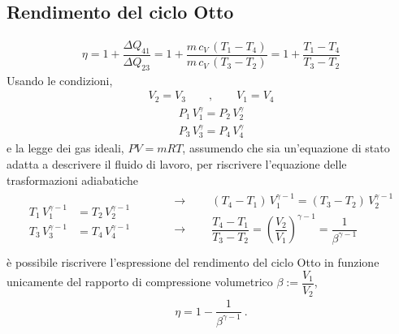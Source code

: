 \documentclass[letterpaper,10pt,italian]{jupyterBook}
\begin{document}
\subsection{Rendimento del ciclo Otto}
\label{\detokenize{ch/thermodynamics/heat-engine-otto:rendimento-del-ciclo-otto}}\begin{equation*}
\begin{split}\eta = 1 + \dfrac{\Delta Q_{41}}{\Delta Q_{23}}
       = 1 + \dfrac{m \, c_V \, (T_1 - T_4)}{m \, c_V \, (T_3 - T_2)}
       = 1 + \dfrac{T_1 - T_4}{T_3 - T_2}
\end{split}
\end{equation*}
\sphinxAtStartPar
Usando le condizioni,  
\begin{equation*}
\begin{split}V_2 = V_3 \qquad , \qquad V_1 = V_4\end{split}
\end{equation*}\begin{equation*}
\begin{split}P_1 \, V_1^{\gamma} = P_2 \, V_2^{\gamma}\end{split}
\end{equation*}\begin{equation*}
\begin{split}P_3 \, V_3^{\gamma} = P_4 \, V_4^{\gamma}\end{split}
\end{equation*}
\sphinxAtStartPar
e la legge dei gas ideali, \(P V = m R T\), assumendo che sia un’equazione di stato adatta a descrivere il fluido di lavoro, per riscrivere l’equazione delle trasformazioni adiabatiche
\begin{equation*}
\begin{split}\begin{aligned}
  T_1 \, V_1^{\gamma-1} & = T_2 \, V_2^{\gamma-1} \\
  T_3 \, V_3^{\gamma-1} & = T_4 \, V_4^{\gamma-1}
\end{aligned}
\begin{aligned}
  & \qquad \rightarrow \qquad  (T_4 - T_1) \, V_1^{\gamma-1} = (T_3 - T_2) \, V_2^{\gamma - 1} \\
  & \qquad \rightarrow \qquad  \dfrac{T_4 - T_1}{T_3 - T_2} = \left( \dfrac{V_2}{V_1} \right)^{\gamma-1} = \dfrac{1}{\beta^{\gamma - 1}} \\
\end{aligned}
\end{split}
\end{equation*}
\sphinxAtStartPar
è possibile riscrivere l’espressione del rendimento del ciclo Otto in funzione unicamente del rapporto di compressione volumetrico \(\beta := \dfrac{V_1}{V_2}\),
\begin{equation*}
\begin{split}\eta = 1 - \dfrac{1}{\beta^{\gamma-1}} \ .\end{split}
\end{equation*}
\end{document}
